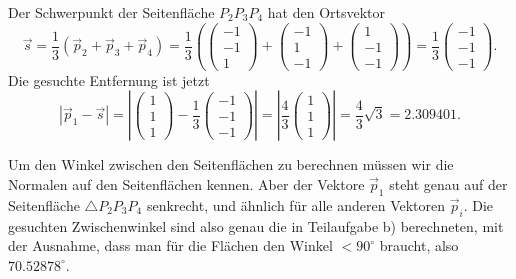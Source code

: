 \begin{loesung}
\begin{teilaufgaben}
\item
Der Schwerpunkt der Seitenfläche $P_2P_3P_4$ hat den Ortsvektor
\[
\vec s=\frac13(\vec p_2+\vec p_3+\vec p_4)
=
\frac13\left(
\begin{pmatrix}-1\\-1\\ 1\end{pmatrix}+
\begin{pmatrix}-1\\ 1\\-1\end{pmatrix}+
\begin{pmatrix} 1\\-1\\-1\end{pmatrix}
\right)
=\frac13
\begin{pmatrix} -1\\-1\\-1 \end{pmatrix}.
\]
Die gesuchte Entfernung ist jetzt
\[
|\vec p_1-\vec s|
=
\left|
\begin{pmatrix}1\\1\\1\end{pmatrix}
-
\frac13\begin{pmatrix} -1\\-1\\-1 \end{pmatrix}
\right|
=
\left|
\frac43\begin{pmatrix}1\\1\\1\end{pmatrix}
\right|
=\frac43\sqrt{3}=2.309401.
\]
\item
Um den Winkel zwischen den Seitenflächen zu berechnen müssen wir die 
Normalen auf den Seitenflächen kennen. Aber der Vektore $\vec p_1$ steht
genau auf der Seitenfläche $\triangle P_2P_3P_4$ senkrecht, und ähnlich
für alle anderen Vektoren $\vec p_i$. Die gesuchten Zwischenwinkel
sind also genau die in Teilaufgabe b) berechneten, mit der Ausnahme, dass
man für die Flächen den Winkel $<90^\circ$ braucht, also $70.52878^\circ$.
\qedhere
\end{teilaufgaben}
\end{loesung}
